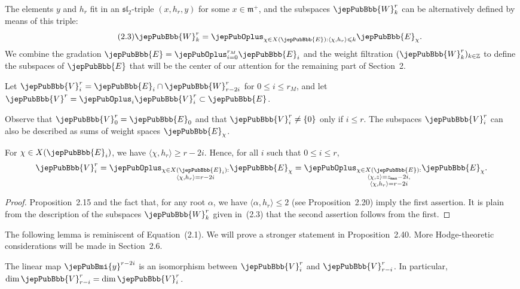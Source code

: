 The elements $y$ and $h_r$ fit in an $\mathfrak{sl}_2$-triple $(x,h_r,y)$ for some $x\in\mathfrak m^+$, and the subspaces $\jepPubBbb{W}^r_k$ can be alternatively defined by means of this triple:
\begin{equation}\tag{2.3}
\jepPubBbb{W}^r_k=\jepPubOplus_{\chi\in X(\jepPubBbb{E}):\langle\chi,h_r\rangle\leqslant k}\jepPubBbb{E}_\chi.
\end{equation}
We combine the gradation $\jepPubBbb{E}=\jepPubOplus_{i=0}^{r_M}\jepPubBbb{E}_i$ and the weight filtration $(\jepPubBbb{W}^r_k)_{k\in\mathbb Z}$ to define the subspaces of $\jepPubBbb{E}$ that will be the center of our attention for the remaining part of Section~2.
\begin{notation}
Let $\jepPubBbb{V}^r_i=\jepPubBbb{E}_i\cap\jepPubBbb{W}^r_{r-2i}$ for $0\leqslant i\leqslant r_M$, and let $\jepPubBbb{V}^r=\jepPubOplus_i\jepPubBbb{V}^r_i\subset\jepPubBbb{E}$.
\end{notation}
Observe that $\jepPubBbb{V}^r_0=\jepPubBbb{E}_0$ and that $\jepPubBbb{V}^r_i\neq\{0\}$ only if $i\leqslant r$. The subspaces $\jepPubBbb{V}^r_i$ can also be described as sums of weight spaces $\jepPubBbb{E}_\chi$.
\begin{proposition}
For $\chi\in X(\jepPubBbb{E}_i)$, we have $\langle\chi,h_r\rangle\geqslant r-2i$. Hence, for all $i$ such that $0\leqslant i\leqslant r$,
\[
\jepPubBbb{V}^r_i=\jepPubOplus_{\substack{\chi\in X(\jepPubBbb{E}_i):\\\langle\chi,h_r\rangle=r-2i}}\jepPubBbb{E}_\chi=\jepPubOplus_{\substack{\chi\in X(\jepPubBbb{E}):\\\langle\chi,z\rangle=z_{\mathtt{max}}-2i,\\\langle\chi,h_r\rangle=r-2i}}\jepPubBbb{E}_\chi.
\]
\end{proposition}
\begin{proof}
Proposition~2.15 and the fact that, for any root $\alpha$, we have $\langle\alpha,h_r\rangle\leqslant2$ (see Proposition~2.20) imply the first assertion. It is plain from the description of the subspaces $\jepPubBbb{W}^r_k$ given in~(2.3) that the second assertion follows from the first.
\end{proof}
The following lemma is reminiscent of Equation~(2.1). We will prove a stronger statement in Proposition~2.40. More Hodge-theoretic considerations will be made in Section~2.6.
\begin{lemma}
The linear map $\jepPubBmi{y}^{r-2i}$ is an isomorphism between $\jepPubBbb{V}^r_i$ and $\jepPubBbb{V}^r_{r-i}$. In particular, $\dim\jepPubBbb{V}^r_{r-i}=\dim\jepPubBbb{V}^r_i$.
\end{lemma}

